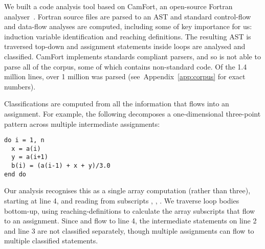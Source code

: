 We built a code analysis tool based on CamFort, an open-source Fortran
analyser~\cite{camfort}. Fortran source files are parsed to an AST and
 standard control-flow and data-flow analyses are computed,
including some of key importance for us: induction variable identification
and reaching definitions. The resulting AST is traversed top-down and
assignment statements inside loops are analysed and classified.
CamFort implements standards compliant parsers, and so is not able
to parse all of the corpus, some of which contains non-standard code.
Of the 1.4 million lines, over 1 million was parsed
(see~Appendix~\ref{app:corpus} for exact numbers).

Classifications are computed from all the information that flows into an
assignment. For example, the following decomposes a one-dimensional
three-point pattern across multiple intermediate assignments:
\begin{verbatim}
do i = 1, n
  x = a(i)
  y = a(i+1)
  b(i) = (a(i-1) + x + y)/3.0
end do
\end{verbatim}
Our analysis recognises this as a single array computation (rather
than three), starting at line 4, and reading from subscripts
, , . We
traverse loop bodies bottom-up, using reaching-definitions to
calculate the array subscripts that flow to an assignment. Since
 and  flow to line 4, the intermediate
statements on line 2 and line 3 are not classified separately, though
multiple assignments can flow to multiple classified statements.

